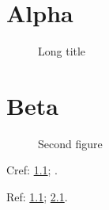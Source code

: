 \documentclass{report}
\begin{document}
\listoffigures
\chapter{Alpha}
\begin{figure}[h]
  \centering
  \caption[Short]{Long title}\label{fig:one}
\end{figure}
\chapter{Beta}
\begin{figure}[h]
  \centering
  \caption{Second figure}\label{fig:two}
\end{figure}

Cref: \cref{fig:one}; .

Ref: \ref{fig:one}; \ref{fig:two}.
\end{document}
